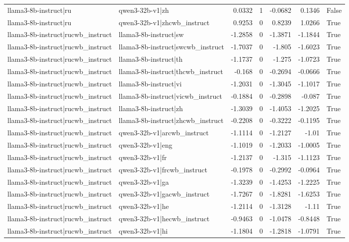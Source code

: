 \begin{table}
\begin{tabular}{l l r r r r l}
llama3-8b-instruct|ru & qwen3-32b-v1|zh & 0.0332 & 1 & -0.0682 & 0.1346 & False \\
llama3-8b-instruct|ru & qwen3-32b-v1|zhcwb_instruct & 0.9253 & 0 & 0.8239 & 1.0266 & True \\
llama3-8b-instruct|rucwb_instruct & llama3-8b-instruct|sw & -1.2858 & 0 & -1.3871 & -1.1844 & True \\
llama3-8b-instruct|rucwb_instruct & llama3-8b-instruct|swcwb_instruct & -1.7037 & 0 & -1.805 & -1.6023 & True \\
llama3-8b-instruct|rucwb_instruct & llama3-8b-instruct|th & -1.1737 & 0 & -1.275 & -1.0723 & True \\
llama3-8b-instruct|rucwb_instruct & llama3-8b-instruct|thcwb_instruct & -0.168 & 0 & -0.2694 & -0.0666 & True \\
llama3-8b-instruct|rucwb_instruct & llama3-8b-instruct|vi & -1.2031 & 0 & -1.3045 & -1.1017 & True \\
llama3-8b-instruct|rucwb_instruct & llama3-8b-instruct|vicwb_instruct & -0.1884 & 0 & -0.2898 & -0.087 & True \\
llama3-8b-instruct|rucwb_instruct & llama3-8b-instruct|zh & -1.3039 & 0 & -1.4053 & -1.2025 & True \\
llama3-8b-instruct|rucwb_instruct & llama3-8b-instruct|zhcwb_instruct & -0.2208 & 0 & -0.3222 & -0.1195 & True \\
llama3-8b-instruct|rucwb_instruct & qwen3-32b-v1|arcwb_instruct & -1.1114 & 0 & -1.2127 & -1.01 & True \\
llama3-8b-instruct|rucwb_instruct & qwen3-32b-v1|eng & -1.1019 & 0 & -1.2033 & -1.0005 & True \\
llama3-8b-instruct|rucwb_instruct & qwen3-32b-v1|fr & -1.2137 & 0 & -1.315 & -1.1123 & True \\
llama3-8b-instruct|rucwb_instruct & qwen3-32b-v1|frcwb_instruct & -0.1978 & 0 & -0.2992 & -0.0964 & True \\
llama3-8b-instruct|rucwb_instruct & qwen3-32b-v1|ga & -1.3239 & 0 & -1.4253 & -1.2225 & True \\
llama3-8b-instruct|rucwb_instruct & qwen3-32b-v1|gacwb_instruct & -1.7267 & 0 & -1.8281 & -1.6253 & True \\
llama3-8b-instruct|rucwb_instruct & qwen3-32b-v1|he & -1.2114 & 0 & -1.3128 & -1.11 & True \\
llama3-8b-instruct|rucwb_instruct & qwen3-32b-v1|hecwb_instruct & -0.9463 & 0 & -1.0478 & -0.8448 & True \\
llama3-8b-instruct|rucwb_instruct & qwen3-32b-v1|hi & -1.1804 & 0 & -1.2818 & -1.0791 & True \\

\end{tabular}
\end{table}
